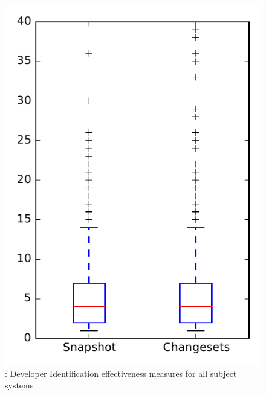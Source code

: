 
\begin{figure}
\centering
\includegraphics[height=0.4\textheight]{figures/dit/rq1_overview}
\caption{\done: Developer Identification effectiveness measures for all subject systems}
\label{fig:dit:rq1:overview}
\end{figure}
